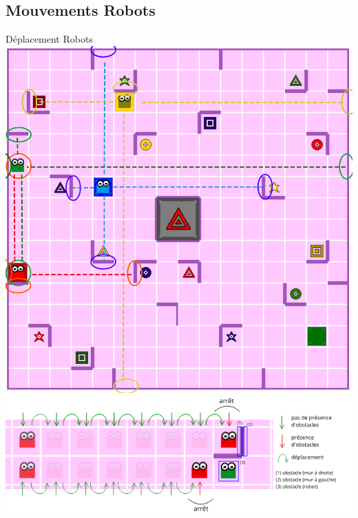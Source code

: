 \documentclass{beamer}
\begin{document}
    \subsection{Mouvements Robots}    
        \begin{frame}{Déplacement Robots}
            \centering
            \includegraphics[scale=0.15]{Images/collision.png}
            \includegraphics[scale = 0.4]{Images/deplacements.png}
        \end{frame}
        
\end{document}
